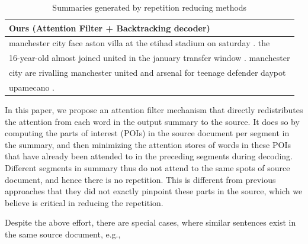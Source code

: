 \begin{table}[th]
\begin{center}
\begin{tabular}{|l|}
\hline \bf Ours (Attention Filter + Backtracking decoder) \\
\hline manchester city face aston villa at the etihad stadium on saturday . the \\
       16-year-old almost joined united in the january transfer window . manchester \\
	   city are rivalling manchester united and arsenal for teenage defender daypot \\
	   upamecano .\\
\hline
\end{tabular}
\end{center}
\caption{\label{tab:strong_methods} Summaries generated by repetition
reducing methods }
\end{table}

In this paper, we propose an attention filter mechanism that directly 
redistributes the attention from each word in the output summary to the source. 
It does so by computing the parts of interest (POIs) in the source document
per segment in the summary, and then minimizing the attention stores of
words in these POIs that have already been attended to in the preceding 
segments during decoding. 
Different segments in summary thus do not attend to the same spots
of source document, and hence there is no repetition. 
This is different from previous approaches
that they did not exactly pinpoint these parts in the source,
which we believe is critical in reducing the repetition. 

Despite the above effort, there are special cases, where similar sentences 
exist in the same source document, e.g.,


